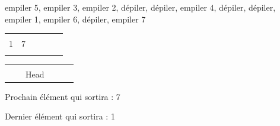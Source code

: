 \documentclass[11pt,a4paper]{article}
\begin{document}
\begin{center}

\begin{large}
empiler 5, empiler 3, empiler 2, dépiler, dépiler, empiler 4, dépiler, dépiler, empiler 1, \linebreak empiler 6, dépiler, empiler 7
\end{large}

\bigskip

\begin{tabular}{ | C{1cm} | C{1cm} | C{1cm} | C{1cm} | C{1cm} | C{1cm} | }
  \hline
     &    &    &    &    &    \\
   1  &  7  &    &    &    &    \\
     &    &    &    &    &    \\
  \hline
\end{tabular}

\smallskip

\begin{tabular}{   C{1cm}   C{1cm}   C{1cm}   C{1cm}   C{1cm}   C{1cm}   }
  &  &  &  &  &  \\
  &  & Head &  &  &  \\
\end{tabular}


\begin{table}[ht!]
  \begin{minipage}{0.50\textwidth}

Prochain élément qui sortira : \hspace*{1cm} 7

  \end{minipage}
  \hfillx
  \begin{minipage}{0.50\textwidth}

Dernier élément qui sortira : \hspace*{1cm} 1

  \end{minipage}
\end{table}
\end{center}
\end{document}

